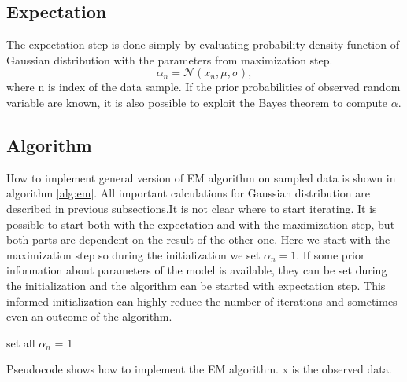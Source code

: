 \subsection{Expectation}
The expectation step is done simply by evaluating probability density function of Gaussian distribution with the parameters from maximization step.
\begin{equation}
\alpha_n = \mathcal{N}(x_n, \mu, \sigma),
\end{equation}
where n is index of the data sample. If the prior probabilities of observed random variable are known, it is also possible to exploit the Bayes theorem to compute $\alpha$.

\subsection{Algorithm}
How to implement general version of EM algorithm on sampled data is shown in algorithm \ref{alg:em}. All important calculations for Gaussian distribution are described in previous subsections.It is not clear where to start iterating. It is possible to start both with the expectation and with the maximization step, but both parts are dependent on the result of the other one. Here we start with the maximization step so during the initialization we set $\alpha_n = 1$. If some prior information about parameters of the model is available, they can be set during the initialization and the algorithm can be started with expectation step. This informed initialization can highly reduce the number of iterations and sometimes even an outcome of the algorithm.
\begin{algorithm}[]
 set all $\alpha_n$ = 1\;
 \caption{Pseudocode shows how to implement the EM algorithm. x is the observed data.}
 \label{alg:em}
\end{algorithm}



